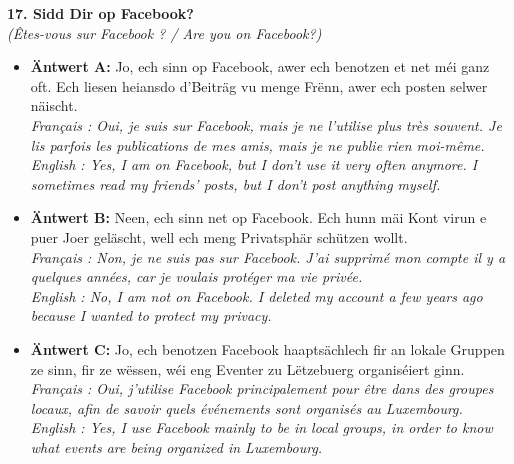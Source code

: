 \noindent\textbf{17. Sidd Dir op Facebook?}\\
\textit{(Êtes-vous sur Facebook ? / Are you on Facebook?)}
\begin{itemize}
    \item \textbf{Äntwert A:} Jo, ech sinn op Facebook, awer ech benotzen et net méi ganz oft. Ech liesen heiansdo d'Beiträg vu menge Frënn, awer ech posten selwer näischt.\\
    \textit{Français : Oui, je suis sur Facebook, mais je ne l'utilise plus très souvent. Je lis parfois les publications de mes amis, mais je ne publie rien moi-même.}\\
    \textit{English : Yes, I am on Facebook, but I don't use it very often anymore. I sometimes read my friends' posts, but I don't post anything myself.}
    \item \textbf{Äntwert B:} Neen, ech sinn net op Facebook. Ech hunn mäi Kont virun e puer Joer geläscht, well ech meng Privatsphär schützen wollt.\\
    \textit{Français : Non, je ne suis pas sur Facebook. J'ai supprimé mon compte il y a quelques années, car je voulais protéger ma vie privée.}\\
    \textit{English : No, I am not on Facebook. I deleted my account a few years ago because I wanted to protect my privacy.}
    \item \textbf{Äntwert C:} Jo, ech benotzen Facebook haaptsächlech fir an lokale Gruppen ze sinn, fir ze wëssen, wéi eng Eventer zu Lëtzebuerg organiséiert ginn.\\
    \textit{Français : Oui, j'utilise Facebook principalement pour être dans des groupes locaux, afin de savoir quels événements sont organisés au Luxembourg.}\\
    \textit{English : Yes, I use Facebook mainly to be in local groups, in order to know what events are being organized in Luxembourg.}
\end{itemize}
\vspace{0.5em}

